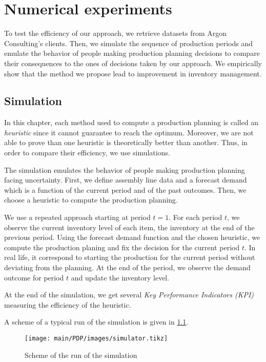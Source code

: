 \chapter{Numerical experiments}
\label{chap:PDP:numerical-experiments}


To test the efficiency of our approach, we retrieve datasets from Argon Consulting's clients.
Then, we simulate the sequence of production periods and emulate the behavior of people making production planning decisions to compare their consequences to the ones of decisions taken by our approach.
We empirically show that the method we propose lead to improvement in inventory management.


\section{Simulation}


In this chapter, each method used to compute a production planning is called an \emph{heuristic} since it cannot guarantee to reach the optimum.
Moreover, we are not able to prove than one heuristic is theoretically better than another.
Thus, in order to compare their efficiency, we use simulations.


The simulation emulates the behavior of people making production planning facing uncertainty.
First, we define assembly line data and a forecast demand which is a function of the current period and of the past outcomes.
Then, we choose a heuristic to compute the production planning.


We use a repeated approach starting at period $t=1$.
For each period $t$, we observe the current inventory level of each item, \ie the inventory at the end of the previous period.
Using the forecast demand function and the chosen heuristic, we compute the production planing and fix the decision for the current period $t$.
In real life, it correspond to starting the production for the current period without deviating from the planning.
At the end of the period, we observe the demand outcome for period $t$ and update the inventory level.


At the end of the simulation, we get several \emph{Key Performance Indicators (KPI)} measuring the efficiency of the heuristic.


A scheme of a typical run of the simulation is given in \cref{fig:simulator}.

\begin{figure}[h]
  \centering
  \texttt{[image: main/PDP/images/simulator.tikz]}
  \caption{Scheme of the run of the simulation}
  \label{fig:simulator}
\end{figure}


